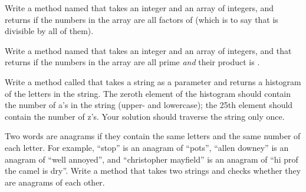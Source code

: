 \begin{exercise}  %

Write a method named  that takes an integer  and an array of integers, and returns  if the numbers in the array are all factors of  (which is to say that  is divisible by all of them).

\end{exercise}


\begin{exercise}  %

Write a method named  that takes an integer  and an array of integers, and that returns  if the numbers in the array are all prime {\it and} their product is .

\end{exercise}


\begin{exercise}  %

Write a method called  that takes a string as a parameter and returns a histogram of the letters in the string.
The zeroth element of the histogram should contain the number of a's in the string (upper- and lowercase); the 25th element should contain the number of z's.
Your solution should traverse the string only once.

\end{exercise}


\begin{exercise}  %


Two words are anagrams if they contain the same letters and the same number of each letter.
For example, ``stop'' is an anagram of ``pots'', ``allen downey'' is an anagram of ``well annoyed'', and ``christopher mayfield'' is an anagram of ``hi prof the camel is dry''.
Write a method that takes two strings and checks whether they are anagrams of each other.

\end{exercise}
